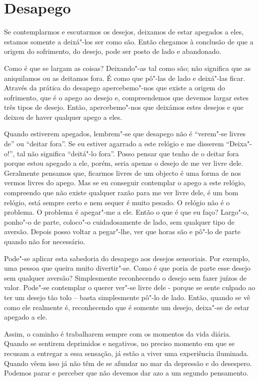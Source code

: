\section{Desapego}

Se contemplarmos e escutarmos os desejos, deixamos de estar apegados a eles,
estamos somente a deixá"-los ser como são. Então chegamos à conclusão de que a
origem do sofrimento, do desejo, pode ser posto de lado e abandonado.

Como é que se largam as coisas? Deixando"-as tal como são; não significa que as
aniquilamos ou as deitamos fora. É como que pô"-las de lado e deixá"-las ficar.
Através da prática do desapego apercebemo"-nos que existe a origem do sofrimento,
que é o apego ao desejo e, compreendemos que devemos largar estes três tipos de
desejo. Então, apercebemo"-nos que deixámos estes desejos e que deixou de haver
qualquer apego a eles.

Quando estiverem apegados, lembrem"-se que desapego não é “verem"-se livres de” ou
“deitar fora”. Se eu estiver agarrado a este relógio e me disserem “Deixa"-o!”,
tal não significa “deitá"-lo fora”. Posso pensar que tenho de o deitar fora
porque estou apegado a ele, porém, seria apenas o desejo de me ver livre dele.
Geralmente pensamos que, ficarmos livres de um objecto é uma forma de nos vermos
livres do apego. Mas se eu conseguir contemplar o apego a este relógio,
compreendo que não existe qualquer razão para me ver livre dele, é um bom
relógio, está sempre certo e nem sequer é muito pesado. O relógio não é o
problema. O problema é apegar"-me a ele. Então o que é que eu faço? Largo"-o,
ponho"-o de parte, coloco"-o cuidadosamente de lado, sem qualquer tipo de aversão.
Depois posso voltar a pegar"-lhe, ver que horas são e pô"-lo de parte quando não
for necessário.

Pode"-se aplicar esta sabedoria do desapego aos desejos sensoriais. Por exemplo,
uma pessoa que queira muito divertir"-se. Como é que poria de parte esse desejo
sem qualquer aversão? Simplesmente reconhecendo o desejo sem fazer juízos de
valor. Pode"-se contemplar o querer ver"-se livre dele - porque se sente culpado
ao ter um desejo tão tolo -- basta simplesmente pô"-lo de lado. Então, quando se
vê como ele realmente é, reconhecendo que é somente um desejo, deixa"-se de estar
apegado a ele.

Assim, o caminho é trabalharem sempre com os momentos da vida diária. Quando se
sentirem deprimidos e negativos, no preciso momento em que se recusam a entregar
a essa sensação, já estão a viver uma experiência iluminada. Quando vêem isso já
não têm de se afundar no mar da depressão e do desespero. Podemos parar e
perceber que não devemos dar azo a um segundo pensamento.

